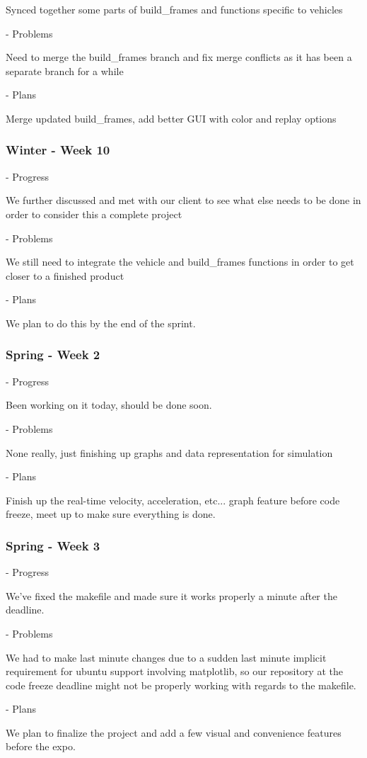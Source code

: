 \documentclass[onecolumn, draftclsnofoot,10pt, compsoc]{IEEEtran}
\begin{document}
Synced together some parts of build\_frames and functions specific to vehicles

- Problems

Need to merge the build\_frames branch and fix merge conflicts as it has been a separate branch for a while

- Plans

Merge updated build\_frames, add better GUI with color and replay options
\subsubsection{Winter - Week 10}
- Progress

We further discussed and met with our client to see what else needs to be done in order to consider this a complete project

- Problems

We still need to integrate the vehicle and build\_frames functions in order to get closer to a finished product

- Plans

We plan to do this by the end of the sprint.
\subsubsection{Spring - Week 2}
- Progress

Been working on it today, should be done soon.

- Problems

None really, just finishing up graphs and data representation for simulation

- Plans

Finish up the real-time velocity, acceleration, etc... graph feature before code freeze, meet up to make sure everything is done.
\subsubsection{Spring - Week 3}
- Progress

We've fixed the makefile and made sure it works properly a minute after the deadline.

- Problems

We had to make last minute changes due to a sudden last minute implicit requirement for ubuntu support involving matplotlib, so our repository at the code freeze deadline might not be properly working with regards to the makefile.

- Plans

We plan to finalize the project and add a few visual and convenience features before the expo.
\end{document}
